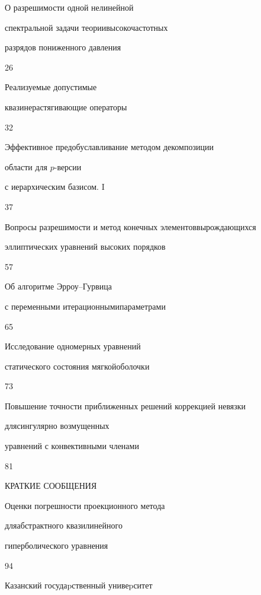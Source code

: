 

{О разрешимости одной нелинейной


спектральной задачи теории\newline высокочастотных


разрядов пониженного давления}{26}




{Реализуемые допустимые


квазинерастягивающие операторы}{32}




{Эффективное предобуславливание методом декомпозиции\newline


области для $p$-версии


с иерархическим базисом. I}{37}




{Вопросы разрешимости и метод конечных элементов\newline вырождающихся


эллиптических уравнений высоких порядков}{57}




{Об алгоритме Эрроу--Гурвица


с переменными итерационными\newline параметрами}{65}




{Исследование одномерных уравнений 


статического состояния мягкой\newline оболочки}{73}




{Повышение точности приближенных решений коррекцией невязки


для\newline сингулярно возмущенных


уравнений с конвективными членами}{81}








\bigskip


{\centerline{КРАТКИЕ СООБЩЕНИЯ}}


\bigskip







{Оценки погрешности проекционного метода


для\newline абстрактного квазилинейного


гиперболического уравнения}{94}








\vfill


\noindent\raisebox{2pt}{\copyright} Казанский госудаpственный унивеpситет





